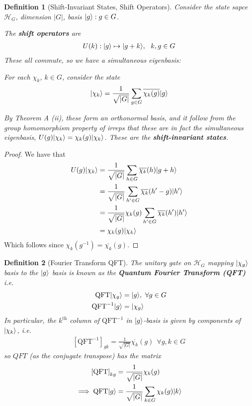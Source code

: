 \documentclass[]{article}
\DeclarePairedDelimiter\ket{\lvert}{\rangle}
\theoremstyle{custhm}
\theoremstyle{cusdef}
\theoremstyle{custhm}
\theoremstyle{custhm}
\theoremstyle{custhm}
\theoremstyle{custhm}
\theoremstyle{cusdef}
\newtheorem*{defin*}{Definition}
\theoremstyle{remark}
\newcommand{\undf}[1]{\textit{\textbf{#1}}}
\renewcommand{\it}[1]{\textit{#1}}
\newcommand{\qft}{\textrm{QFT}}
\begin{document}
\begin{defin*}[Shift-Invariant States, Shift Operators]
Consider the state sapce $\mathcal{H}_G$, dimension $|G|$, basis $\ket{g}:g\in G$.

The \undf{shift operators} are
\begin{align*}
	U(k) : \ket{g} \mapsto \ket{g+k},\ \ k,g\in G
\end{align*}
These all commute, so we have a simultaneous eigenbasis:

For each $\chi_k$, $k\in G$, consider the state
\begin{align*}
\ket{\chi_k} = \frac{1}{\sqrt{|G|}}\sum_{g\in G}\overline{\chi_k(g)}\ket{g}
\end{align*}

By Theorem A (ii), these form an orthonormal basis, and it follow from the group homomorphism property of irreps that these are in fact the simultaneous eigenbasis, $U(g)\ket{\chi_k} = \chi_k(g)\ket{\chi_k}$. These are the \undf{shift-invariant states}.
\end{defin*}
\begin{proof}
We have that
\begin{align*}
U(g)\ket{\chi_k} &= \frac{1}{\sqrt{|G|}}\sum_{h\in G}\overline{\chi_k}(h)\ket{g+h}\\
&= \frac{1}{\sqrt{|G|}}\sum_{h'\in G}\overline{\chi_k}(h'-g)\ket{h'}\\
&= \frac{1}{\sqrt{|G|}}\chi_k(g)\sum_{h'\in G}\overline{\chi_k}(h')\ket{h'}\\
&= \chi_k(g)\ket{\chi_k}
\end{align*}
Which follows since $\chi_k(g^{-1}) = \overline{\chi_k}(g)$.
\end{proof}
\begin{defin*}[Fourier Transform QFT]
The unitary gate on $\mathcal{H}_G$ mapping $\ket{\chi_g}$ basis to the $\ket{g}$ basis is known as the \undf{Quantum Fourier Transform (QFT)} {\it i.e.}
\begin{align*}
\qft\ket{\chi_g} &= \ket{g},\ \forall g\in G\\
\qft^{-1}\ket{g} &= \ket{\chi_g}
\end{align*}
In particular, the $k^{\textrm{th}}$ column of $\qft^{-1}$ in $\ket{g}$-basis is given by components of $\ket{\chi_k}$, {\it i.e.}
\begin{align*}
	\left[\qft^{-1}\right]_{gk} = \frac{1}{\sqrt{|G|}}\overline{\chi_k}(g)\ \ \forall g,k\in G
\end{align*}
so $QFT$ (as the conjugate transpose) has the matrix
\begin{align*}
\left[\qft\right]_{kg} &= \frac{1}{\sqrt{|G|}}\chi_k(g)\\
\implies \qft\ket{g} &= \frac{1}{\sqrt{|G|}}\sum_{k\in G}\chi_k(g)\ket{k}
\end{align*}
\end{defin*}
\end{document}
